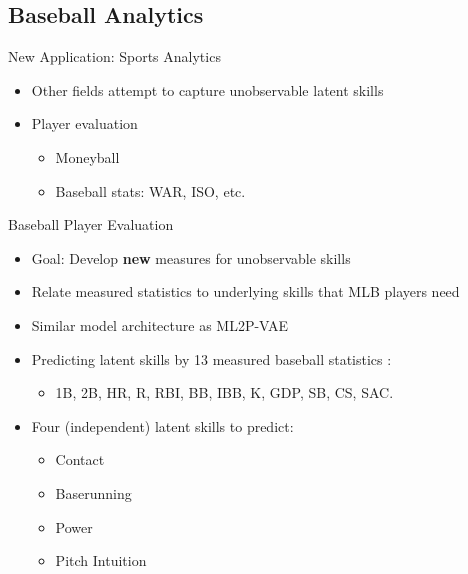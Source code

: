 \documentclass{beamer}
\theoremstyle{definition}
\begin{document}
\subsection{Baseball Analytics}

\begin{frame}{New Application: Sports Analytics}
\begin{itemize}
  \item Other fields attempt to capture unobservable latent skills
  \item Player evaluation
  \begin{itemize}
    \item Moneyball
    \item Baseball stats: WAR, ISO, etc.
  \end{itemize}
\end{itemize}
\begin{figure}
\end{figure}
\end{frame}

\begin{frame}{Baseball Player Evaluation}
\begin{itemize}
  \item Goal: Develop \textbf{new} measures for unobservable skills
  \item<2-> Relate measured statistics to underlying skills that MLB players need
  \item<2-> Similar model architecture as ML2P-VAE
  \item<3-> Predicting latent skills by 13 measured baseball statistics :
  \begin{itemize}
      \item<3-> 1B, 2B, HR, R, RBI, BB, IBB, K, GDP, SB, CS, SAC.
  \end{itemize}
  \item<4-> Four (independent) latent skills to predict:
  \begin{itemize}
  \item<4-> Contact
  \item<4-> Baserunning
  \item<4-> Power
  \item<4-> Pitch Intuition    
  \end{itemize}  
\end{itemize}
\end{frame}
\end{document}
